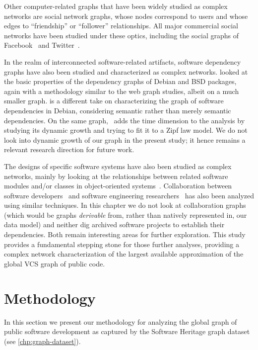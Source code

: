 Other computer-related graphs that have been widely studied as complex networks
are social network graphs, whose nodes correspond to users and whose edges to
``friendship'' or ``follower'' relationships. All major commercial social
networks have been studied under these optics, including the social graphs of
Facebook~\cite{ugander2011facebook} and Twitter~\cite{myers2014twitter}.

In the realm of interconnected software-related artifacts, software dependency
graphs have also been studied and characterized as complex networks.
\Cite{labelle2004inter} looked at the basic properties of the dependency graphs
of Debian and BSD packages, again with a methodology similar to the web graph
studies, albeit on a much smaller graph. \Cite{abate2009strong} is a different
take on characterizing the graph of software dependencies in Debian,
considering semantic rather than merely semantic dependencies. On the same
graph,~\cite{maillart2008empirical} adds the time dimension to the analysis by
studying its dynamic growth and trying to fit it to a Zipf law model. We do not
look into dynamic growth of our graph in the present study; it hence remains
a relevant research direction for future work.

The designs of specific software systems have also been studied as complex
networks, mainly by looking at the relationships between related software
modules and/or classes in object-oriented systems~\cite{myers2003software,
  valverde2003hierarchical, wen2007javanetwork}.  Collaboration between
software developers~\cite{singh2010smallworldcollab} and software engineering
researchers~\cite{hassan2004revengsmallworld} has also been analyzed using
similar techniques. In this chapter we do not look at collaboration graphs (which
would be graphs \emph{derivable} from, rather than natively represented in, our
data model) and neither dig archived software projects to establish their
dependencies. Both remain interesting areas for further exploration. This
study provides a fundamental stepping stone for those further analyses,
providing a complex network characterization of the largest available
approximation of the global VCS graph of public code.


\section{Methodology}%
\label{sec:topology-methodology}

In this section we present our methodology for analyzing the global graph of
public software development as captured by the Software Heritage graph dataset
(see \cref{chp:graph-dataset}).

